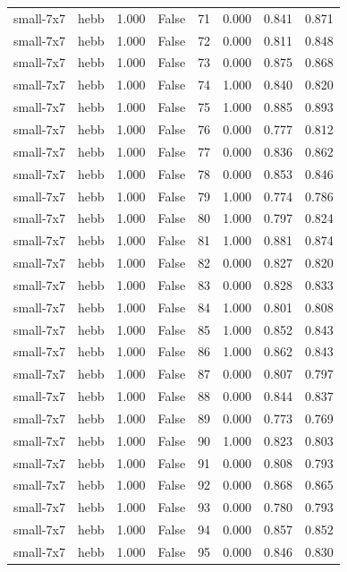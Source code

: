 \begin{tabular}{llrrrrrr}
small-7x7 & hebb & 1.000 & False & 71 & 0.000 & 0.841 & 0.871 \\
small-7x7 & hebb & 1.000 & False & 72 & 0.000 & 0.811 & 0.848 \\
small-7x7 & hebb & 1.000 & False & 73 & 0.000 & 0.875 & 0.868 \\
small-7x7 & hebb & 1.000 & False & 74 & 1.000 & 0.840 & 0.820 \\
small-7x7 & hebb & 1.000 & False & 75 & 1.000 & 0.885 & 0.893 \\
small-7x7 & hebb & 1.000 & False & 76 & 0.000 & 0.777 & 0.812 \\
small-7x7 & hebb & 1.000 & False & 77 & 0.000 & 0.836 & 0.862 \\
small-7x7 & hebb & 1.000 & False & 78 & 0.000 & 0.853 & 0.846 \\
small-7x7 & hebb & 1.000 & False & 79 & 1.000 & 0.774 & 0.786 \\
small-7x7 & hebb & 1.000 & False & 80 & 1.000 & 0.797 & 0.824 \\
small-7x7 & hebb & 1.000 & False & 81 & 1.000 & 0.881 & 0.874 \\
small-7x7 & hebb & 1.000 & False & 82 & 0.000 & 0.827 & 0.820 \\
small-7x7 & hebb & 1.000 & False & 83 & 0.000 & 0.828 & 0.833 \\
small-7x7 & hebb & 1.000 & False & 84 & 1.000 & 0.801 & 0.808 \\
small-7x7 & hebb & 1.000 & False & 85 & 1.000 & 0.852 & 0.843 \\
small-7x7 & hebb & 1.000 & False & 86 & 1.000 & 0.862 & 0.843 \\
small-7x7 & hebb & 1.000 & False & 87 & 0.000 & 0.807 & 0.797 \\
small-7x7 & hebb & 1.000 & False & 88 & 0.000 & 0.844 & 0.837 \\
small-7x7 & hebb & 1.000 & False & 89 & 0.000 & 0.773 & 0.769 \\
small-7x7 & hebb & 1.000 & False & 90 & 1.000 & 0.823 & 0.803 \\
small-7x7 & hebb & 1.000 & False & 91 & 0.000 & 0.808 & 0.793 \\
small-7x7 & hebb & 1.000 & False & 92 & 0.000 & 0.868 & 0.865 \\
small-7x7 & hebb & 1.000 & False & 93 & 0.000 & 0.780 & 0.793 \\
small-7x7 & hebb & 1.000 & False & 94 & 0.000 & 0.857 & 0.852 \\
small-7x7 & hebb & 1.000 & False & 95 & 0.000 & 0.846 & 0.830 \\

\end{tabular}
